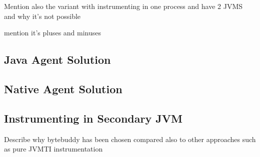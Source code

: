 Mention also the variant with instrumenting in one process and have 2 JVMS and why it's not possible

mention it's pluses and minuses

\subsection{Java Agent Solution}
\subsection{Native Agent Solution}
\subsection{Instrumenting in Secondary JVM}

Describe why bytebuddy has been chosen compared also to other approaches such as pure JVMTI instrumentation 





